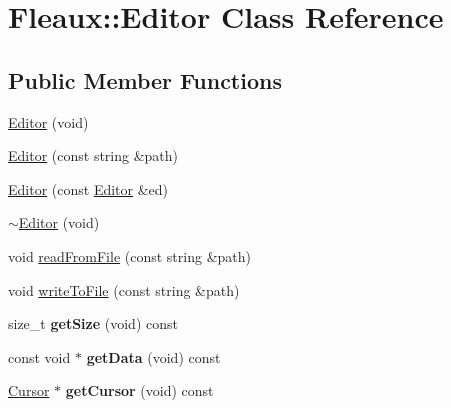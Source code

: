 \hypertarget{classFleaux_1_1Editor}{}\section{Fleaux\+:\+:Editor Class Reference}
\label{classFleaux_1_1Editor}
\subsection*{Public Member Functions}
\begin{DoxyCompactItemize}
\item 
\hyperlink{classFleaux_1_1Editor_a5425124a3ddf55ad2fe2b668548c011f}{Editor} (void)
\item 
\hyperlink{classFleaux_1_1Editor_a023e2569b82e4299d02ddbd0a912fc5e}{Editor} (const string \&path)
\item 
\hyperlink{classFleaux_1_1Editor_a44125eb3c92f032db297029b0039eef8}{Editor} (const \hyperlink{classFleaux_1_1Editor}{Editor} \&ed)
\item 
\hyperlink{classFleaux_1_1Editor_a2be65be385e3a41d16c426c7bcdc00d9}{$\sim$\+Editor} (void)
\item 
void \hyperlink{classFleaux_1_1Editor_ac525cdc5632ff3cf1664a2088a4306e6}{read\+From\+File} (const string \&path)
\item 
void \hyperlink{classFleaux_1_1Editor_ad6f189d15112586cc5cefd37ab82e5f0}{write\+To\+File} (const string \&path)
\item 
\hypertarget{classFleaux_1_1Editor_a71402c284080c5e797086002ccec050e}{}size\+\_\+t {\bfseries get\+Size} (void) const \label{classFleaux_1_1Editor_a71402c284080c5e797086002ccec050e}

\item 
\hypertarget{classFleaux_1_1Editor_abc6fa4d7775054ab7ee8201cde079694}{}const void $\ast$ {\bfseries get\+Data} (void) const \label{classFleaux_1_1Editor_abc6fa4d7775054ab7ee8201cde079694}

\item 
\hypertarget{classFleaux_1_1Editor_a046edb7b31229a1c472240f9f041fee6}{}\hyperlink{classFleaux_1_1Cursor}{Cursor} $\ast$ {\bfseries get\+Cursor} (void) const \label{classFleaux_1_1Editor_a046edb7b31229a1c472240f9f041fee6}

\end{DoxyCompactItemize}
